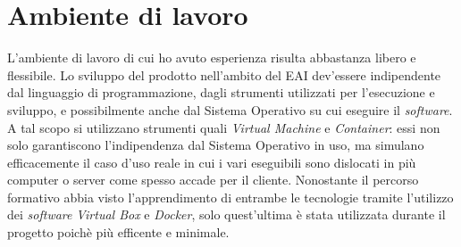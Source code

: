 \section{Ambiente di lavoro}

L'ambiente di lavoro di cui ho avuto esperienza risulta abbastanza libero e flessibile.
Lo sviluppo del prodotto nell'ambito del EAI dev'essere indipendente dal linguaggio di programmazione, dagli strumenti utilizzati per l'esecuzione e sviluppo, e possibilmente anche dal Sistema Operativo su cui eseguire il \textit{software}.
A tal scopo si utilizzano strumenti quali \textit{Virtual Machine} e \textit{Container}: essi non solo garantiscono l'indipendenza dal Sistema Operativo in uso, ma simulano efficacemente il caso d'uso reale in cui i vari eseguibili sono dislocati in più computer o server come spesso accade per il cliente.
Nonostante il percorso formativo abbia visto l'apprendimento di entrambe le tecnologie tramite l'utilizzo dei \textit{software} \textit{Virtual Box} e \textit{Docker}, solo quest'ultima è stata utilizzata durante il progetto poichè più efficente e minimale.
